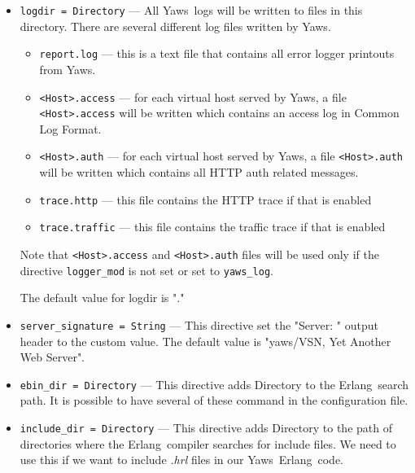 \documentclass[11pt,oneside,english]{book}
\newcommand{\Erlang}            %
        {{\sc Erlang}}
\newcommand{\Yaws}            %
        {{\sc Yaws}}
\begin{document}
\begin{itemize}


\item       \verb+logdir = Directory+ ---
              All \Yaws\  logs will be  written  to  files  in  this
              directory.  There  are  several different log files
              written by \Yaws{}.

              \begin{itemize}
              \item \verb+report.log+ --- this is a text file that contains  all
              error logger printouts from \Yaws{}.
              \item \verb+<Host>.access+ --- for each virtual host
                served by \Yaws{}, a file \verb+<Host>.access+ will be
                written which contains an access log in Common Log
                Format.
              \item \verb+<Host>.auth+ --- for each virtual host served by
              \Yaws{}, a file \verb+<Host>.auth+ will be written which
              contains all HTTP auth related messages.
              \item \verb+trace.http+  ---  this file contains the
                HTTP trace if that is enabled
              \item \verb+trace.traffic+ ---  this  file  contains
                the  traffic trace if that is enabled
              \end{itemize}

              Note that \verb+<Host>.access+ and \verb+<Host>.auth+ files will
              be used only if the directive \verb+logger_mod+ is not set or set
              to \verb+yaws_log+.

              The default value for logdir is "."

\item        \verb+server_signature = String+ ---
              This directive set the "Server: " output header to the custom
              value. The default value is "yaws/VSN, Yet Another Web Server".

\item        \verb+ebin_dir = Directory+ ---
              This  directive adds Directory to the \Erlang\  search
              path. It is possible to have several of these  command
              in the configuration file.

\item        \verb+include_dir = Directory+ ---
              This directive adds Directory to the path of directories
               where  the  \Erlang\   compiler  searches  for
              include  files.  We  need to use this if we want to
              include \textit{.hrl} files in our \Yaws\  \Erlang\  code.


\end{itemize}
\end{document}
